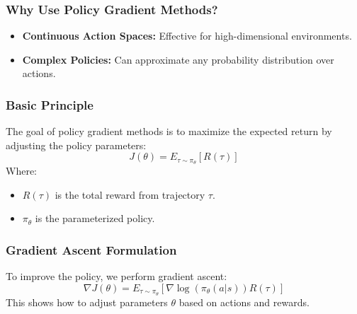 \documentclass[aspectratio=169]{beamer}
\begin{document}
\begin{frame}[fragile]
    \frametitle{Why Use Policy Gradient Methods?}
    \begin{itemize}
        \item \textbf{Continuous Action Spaces:} Effective for high-dimensional environments.
        \item \textbf{Complex Policies:} Can approximate any probability distribution over actions.
    \end{itemize}
\end{frame}

\begin{frame}[fragile]
    \frametitle{Basic Principle}
    The goal of policy gradient methods is to maximize the expected return by adjusting the policy parameters:
    \begin{equation}
        J(\theta) = E_{\tau \sim \pi_\theta} \left[ R(\tau) \right]
    \end{equation}
    Where:
    \begin{itemize}
        \item $R(\tau)$ is the total reward from trajectory $\tau$.
        \item $\pi_\theta$ is the parameterized policy.
    \end{itemize}
\end{frame}

\begin{frame}[fragile]
    \frametitle{Gradient Ascent Formulation}
    To improve the policy, we perform gradient ascent:
    \begin{equation}
        \nabla J(\theta) = E_{\tau \sim \pi_\theta} \left[ \nabla \log(\pi_\theta(a|s)) R(\tau) \right]
    \end{equation}
    This shows how to adjust parameters $\theta$ based on actions and rewards.
\end{frame}
\end{document}
